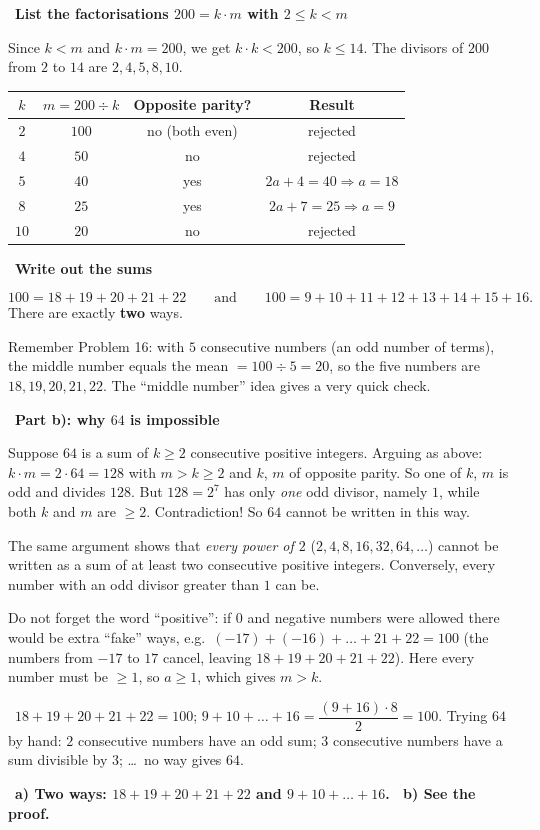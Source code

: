 \documentclass[11pt]{article}
\providecommand{\AnsWord}{Đáp số}
\newcommand{\ans}[1]{\par\smallskip{\bfseries\color{tmGreen!88!black}\AnsWord:}\ {\bfseries\color{AnsRed}#1}\par}
\newcommand{\step}[2]{\par\smallskip\noindent{\bfseries\color{tmBlue!85!black}\StepWord~#1.}\ {\bfseries #2}\par\nopagebreak}
\newcommand{\verify}[1]{\par\smallskip\noindent{\bfseries\color{tmGreen!80!black}\faCheckCircle\ \CheckWord}\ #1\par}
\def\AnsWord{Answer}
\def\StepWord{Step}
\def\CheckWord{Check:}
\begin{document}
{\step{3}{List the factorisations $200=k\cdot m$ with $2\le k<m$}
Since $k<m$ and $k\cdot m=200$, we get $k\cdot k<200$, so $k\le 14$. The divisors of $200$ from $2$ to $14$ are $2,4,5,8,10$.
\begin{center}
\begin{tabular}{|c|c|c|c|}
\hline
\rowcolor{Tint}$k$ & $m=200\div k$ & Opposite parity? & Result\\
\hline
$2$ & $100$ & no (both even) & rejected\\
$4$ & $50$ & no & rejected\\
$5$ & $40$ & yes & $2a+4=40\Rightarrow a=18$\\
$8$ & $25$ & yes & $2a+7=25\Rightarrow a=9$\\
$10$ & $20$ & no & rejected\\
\hline
\end{tabular}
\end{center}

\step{4}{Write out the sums}
\[100=18+19+20+21+22\qquad\text{and}\qquad 100=9+10+11+12+13+14+15+16.\]
There are exactly \textbf{two} ways.

\begin{tipbox}Remember Problem 16: with $5$ consecutive numbers (an odd number of terms), the middle number equals the mean $=100\div 5=20$, so the five numbers are $18,19,20,21,22$. The ``middle number'' idea gives a very quick check.\end{tipbox}

\step{5}{Part b): why $64$ is impossible}
Suppose $64$ is a sum of $k\ge 2$ consecutive positive integers. Arguing as above: $k\cdot m=2\cdot 64=128$ with $m>k\ge 2$ and $k$, $m$ of opposite parity. So one of $k$, $m$ is odd and divides $128$. But $128=2^7$ has only \emph{one} odd divisor, namely $1$, while both $k$ and $m$ are $\ge 2$. Contradiction! So $64$ cannot be written in this way.

\begin{proofbox}The same argument shows that \emph{every power of $2$} ($2,4,8,16,32,64,\dots$) cannot be written as a sum of at least two consecutive positive integers. Conversely, every number with an odd divisor greater than $1$ can be.\end{proofbox}

\begin{warnbox}Do not forget the word ``positive'': if $0$ and negative numbers were allowed there would be extra ``fake'' ways, e.g.\ $(-17)+(-16)+\dots+21+22=100$ (the numbers from $-17$ to $17$ cancel, leaving $18+19+20+21+22$). Here every number must be $\ge 1$, so $a\ge 1$, which gives $m>k$.\end{warnbox}

\verify{$18+19+20+21+22=100$; $9+10+\dots+16=\dfrac{(9+16)\cdot 8}{2}=100$. Trying $64$ by hand: $2$ consecutive numbers have an odd sum; $3$ consecutive numbers have a sum divisible by $3$; \dots\ no way gives $64$.}
\ans{a) Two ways: $18+19+20+21+22$ and $9+10+\dots+16$. \ b) See the proof.}
}
\end{document}
